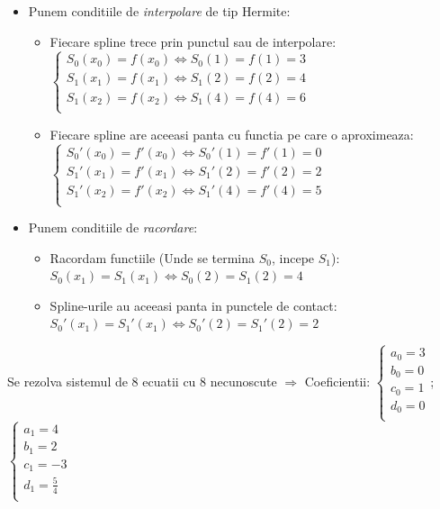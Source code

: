 \documentclass{article}
\begin{document}
\begin{itemize}
    \item Punem conditiile de \textit{interpolare} de tip Hermite:
    \begin{itemize}
        \item Fiecare spline trece prin punctul sau de interpolare:
        $\begin{cases}
            S_0(x_0) = f(x_0) \iff S_0(1) = f(1) = 3 \\
            S_1(x_1) = f(x_1) \iff S_1(2) = f(2) = 4 \\
            S_1(x_2) = f(x_2) \iff S_1(4) = f(4) = 6 \\
        \end{cases}$
        
        \item Fiecare spline are aceeasi panta cu functia pe care o aproximeaza:
        $\begin{cases}
            S_0'(x_0) = f'(x_0) \iff S_0'(1) = f'(1) = 0 \\
            S_1'(x_1) = f'(x_1) \iff S_1'(2) = f'(2) = 2 \\
            S_1'(x_2) = f'(x_2) \iff S_1'(4) = f'(4) = 5 \\
        \end{cases}$
    \end{itemize}
    
    \item Punem conditiile de \textit{racordare}:
    \begin{itemize}
        \item Racordam functiile (Unde se termina $S_0$, incepe $S_1$):
        $S_0(x_1) = S_1(x_1) \iff S_0(2) = S_1(2) = 4$
        
        \item Spline-urile au aceeasi panta in punctele de contact: $S_0'(x_1) = S_1'(x_1) \iff S_0'(2) = S_1'(2) = 2$
    \end{itemize}
\end{itemize}


Se rezolva sistemul de $8$ ecuatii cu $8$ necunoscute $\Longrightarrow$ Coeficientii:
$\begin{cases}
  a_0 = 3 \\
  b_0 = 0 \\
  c_0 = 1 \\
  d_0 = 0 \\
\end{cases}$;\;
$\begin{cases}
  a_1 = 4 \\
  b_1 = 2 \\
  c_1 = -3 \\
  d_1 = \frac{5}{4} \\
\end{cases}$\vspace{0.3cm}
\end{document}
